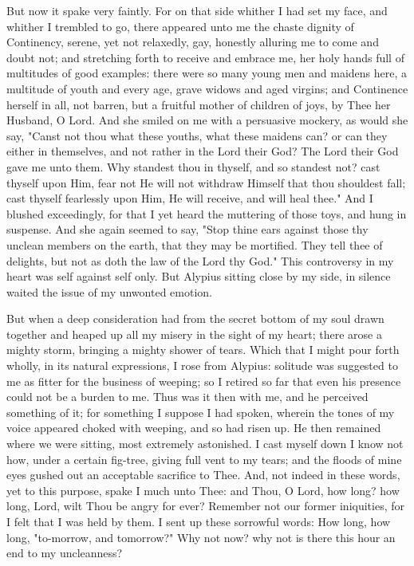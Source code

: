 \documentclass[b5paper,openright,12pt,twoside]{book}
\begin{document}
But now it spake very faintly. For on that side whither I had set my
face, and whither I trembled to go, there appeared unto me the chaste
dignity of Continency, serene, yet not relaxedly, gay, honestly alluring
me to come and doubt not; and stretching forth to receive and embrace
me, her holy hands full of multitudes of good examples: there were so
many young men and maidens here, a multitude of youth and every age,
grave widows and aged virgins; and Continence herself in all, not
barren, but a fruitful mother of children of joys, by Thee her Husband,
O Lord. And she smiled on me with a persuasive mockery, as would she
say, "Canst not thou what these youths, what these maidens can? or can
they either in themselves, and not rather in the Lord their God? The
Lord their God gave me unto them. Why standest thou in thyself, and
so standest not? cast thyself upon Him, fear not He will not withdraw
Himself that thou shouldest fall; cast thyself fearlessly upon Him, He
will receive, and will heal thee." And I blushed exceedingly, for that
I yet heard the muttering of those toys, and hung in suspense. And she
again seemed to say, "Stop thine ears against those thy unclean members
on the earth, that they may be mortified. They tell thee of delights,
but not as doth the law of the Lord thy God." This controversy in my
heart was self against self only. But Alypius sitting close by my side,
in silence waited the issue of my unwonted emotion.

But when a deep consideration had from the secret bottom of my soul
drawn together and heaped up all my misery in the sight of my heart;
there arose a mighty storm, bringing a mighty shower of tears. Which
that I might pour forth wholly, in its natural expressions, I rose from
Alypius: solitude was suggested to me as fitter for the business of
weeping; so I retired so far that even his presence could not be a
burden to me. Thus was it then with me, and he perceived something of
it; for something I suppose I had spoken, wherein the tones of my voice
appeared choked with weeping, and so had risen up. He then remained
where we were sitting, most extremely astonished. I cast myself down I
know not how, under a certain fig-tree, giving full vent to my tears;
and the floods of mine eyes gushed out an acceptable sacrifice to Thee.
And, not indeed in these words, yet to this purpose, spake I much unto
Thee: and Thou, O Lord, how long? how long, Lord, wilt Thou be angry for
ever? Remember not our former iniquities, for I felt that I was held by
them. I sent up these sorrowful words: How long, how long, "to-morrow,
and tomorrow?" Why not now? why not is there this hour an end to my
uncleanness?
\end{document}
